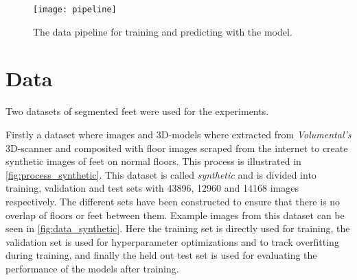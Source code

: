 \documentclass{kththesis}
\begin{document}
\begin{figure}[h]
  \centering
  \texttt{[image: pipeline]}
  \caption{The data pipeline for training and predicting with the model.}
  \label{fig:pipeline}
\end{figure}

\section{Data}
Two datasets of segmented feet were used for the experiments.

Firstly a dataset where images and 3D-models where extracted from
\textit{Volumental's}
3D-scanner and composited with floor images scraped from the internet to create
synthetic images of feet on normal floors. This process is illustrated in \cref{fig:process_synthetic}.
This dataset is called
\textit{synthetic} and is divided into training, validation and test sets with
43896, 12960 and 14168 images respectively. The different sets have been
constructed to ensure that there is no overlap of floors or feet between them.
Example images from this dataset can be seen in \cref{fig:data_synthetic}. Here
the training set is directly used for training, the validation set is used for
hyperparameter optimizations and to track overfitting during training, and
finally the held out test set is used for evaluating the performance of the
models after training.
\end{document}
